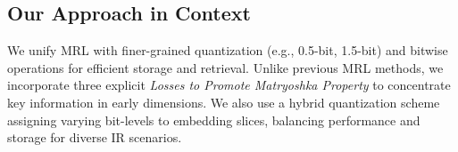 \subsection{Our Approach in Context}
We unify MRL with finer-grained quantization (e.g., 0.5-bit, 1.5-bit) and bitwise operations for efficient storage and retrieval. Unlike previous MRL methods, we incorporate three explicit \emph{Losses to Promote Matryoshka Property} to concentrate key information in early dimensions. We also use a hybrid quantization scheme assigning varying bit-levels to embedding slices, balancing performance and storage for diverse IR scenarios.
